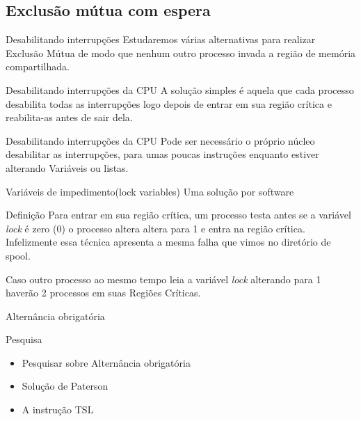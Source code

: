 \documentclass[11pt]{beamer}
\begin{document}
\subsection{Exclusão mútua com espera}

\begin{frame}{Desabilitando interrupções}
 Estudaremos várias alternativas para realizar Exclusão Mútua de modo que nenhum outro processo invada a região de memória compartilhada.
 \begin{block}{Desabilitando interrupções da CPU}
 A solução simples é aquela que cada processo desabilita todas as interrupções logo depois de entrar em sua região crítica e reabilita-as 
 antes de sair dela.
 \end{block}
 
 \pause
 \begin{block}{Desabilitando interrupções da CPU}
 Pode ser necessário o próprio núcleo desabilitar as interrupções, para umas poucas instruções enquanto estiver alterando Variáveis ou listas.
 \end{block}
\end{frame}

\begin{frame}{Variáveis de impedimento(lock variables)}
 Uma solução por software
 
 \pause
  \begin{block}{Definição}
 Para entrar em sua região crítica, um processo testa antes se a variável \textit{lock} é zero (0) o processo altera altera para 1 e entra 
 na região crítica. Infelizmente essa técnica apresenta a mesma falha que vimos no diretório de spool.
  \end{block}
 
 Caso outro processo ao mesmo tempo leia a variável \textit{lock} alterando para 1 haverão 2 processos em suas Regiões Críticas.
\end{frame}

\begin{frame}{Alternância obrigatória}

 \begin{block}{ Pesquisa}
 \begin{itemize}
  \item Pesquisar sobre Alternância obrigatória
  \pause
  \item Solução de Paterson
  \pause
  \item A instrução TSL
 \end{itemize}

  
 \end{block}
 
\end{frame}
\end{document}
